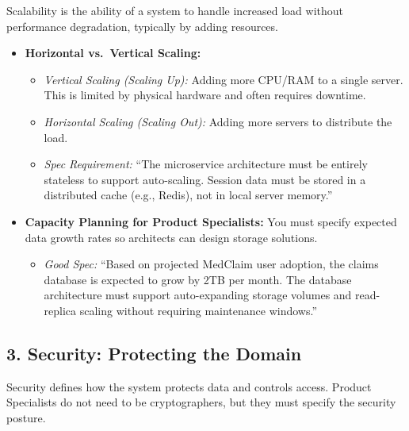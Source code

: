 \documentclass[
  11pt,
  openany,
  oneside]{book}
\providecommand{\tightlist}{%
  \setlength{\itemsep}{0pt}\setlength{\parskip}{0pt}}
\begin{document}
Scalability is the ability of a system to handle increased load without
performance degradation, typically by adding resources.

\begin{itemize}
\tightlist
\item
  \textbf{Horizontal vs.~Vertical Scaling:}

  \begin{itemize}
  \tightlist
  \item
    \emph{Vertical Scaling (Scaling Up):} Adding more CPU/RAM to a
    single server. This is limited by physical hardware and often
    requires downtime.
  \item
    \emph{Horizontal Scaling (Scaling Out):} Adding more servers to
    distribute the load.
  \item
    \emph{Spec Requirement:} ``The microservice architecture must be
    entirely stateless to support auto-scaling. Session data must be
    stored in a distributed cache (e.g., Redis), not in local server
    memory.''
  \end{itemize}
\item
  \textbf{Capacity Planning for Product Specialists:} You must specify
  expected data growth rates so architects can design storage solutions.

  \begin{itemize}
  \tightlist
  \item
    \emph{Good Spec:} ``Based on projected MedClaim user adoption, the
    claims database is expected to grow by 2TB per month. The database
    architecture must support auto-expanding storage volumes and
    read-replica scaling without requiring maintenance windows.''
  \end{itemize}
\end{itemize}

\subsection{3. Security: Protecting the
Domain}\label{security-protecting-the-domain}

Security defines how the system protects data and controls access.
Product Specialists do not need to be cryptographers, but they must
specify the security posture.
\end{document}
